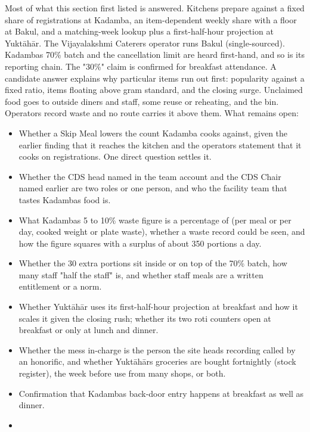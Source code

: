 \documentclass[
  10pt,
  table]{article}
\providecommand{\tightlist}{%
  \setlength{\itemsep}{0pt}\setlength{\parskip}{0pt}}
\renewcommand{\tightlist}{\setlength{\itemsep}{1.5pt}\setlength{\parskip}{0pt}}
\begin{document}
Most of what this section first listed is answered. Kitchens prepare against a fixed share of registrations at Kadamba, an item-dependent weekly share with a floor at Bakul, and a matching-week lookup plus a first-half-hour projection at Yuktāhār. The Vijayalakshmi Caterers operator runs Bakul (single-sourced). Kadamba\textquotesingle s 70\% batch and the cancellation limit are heard first-hand, and so is its reporting chain. The "30\%" claim is confirmed for breakfast attendance. A candidate answer explains why particular items run out first: popularity against a fixed ratio, items floating above gram standard, and the closing surge. Unclaimed food goes to outside diners and staff, some reuse or reheating, and the bin. Operators record waste and no route carries it above them. What remains open:

\begin{itemize}
\tightlist
\item
  Whether a Skip Meal lowers the count Kadamba cooks against, given the earlier finding that it reaches the kitchen and the operator\textquotesingle s statement that it cooks on registrations. One direct question settles it.
\item
  Whether the CDS head named in the team account and the CDS Chair named earlier are two roles or one person, and who the facility team that tastes Kadamba\textquotesingle s food is.
\item
  What Kadamba\textquotesingle s 5 to 10\% waste figure is a percentage of (per meal or per day, cooked weight or plate waste), whether a waste record could be seen, and how the figure squares with a surplus of about 350 portions a day.
\item
  Whether the 30 extra portions sit inside or on top of the 70\% batch, how many staff "half the staff" is, and whether staff meals are a written entitlement or a norm.
\item
  Whether Yuktāhār uses its first-half-hour projection at breakfast and how it scales it given the closing rush; whether its two roti counters open at breakfast or only at lunch and dinner.
\item
  Whether the mess in-charge is the person the site head\textquotesingle s recording called by an honorific, and whether Yuktāhār\textquotesingle s groceries are bought fortnightly (stock register), the week before use from many shops, or both.
\item
  Confirmation that Kadamba\textquotesingle s back-door entry happens at breakfast as well as dinner.
\item

\end{itemize}
\end{document}
